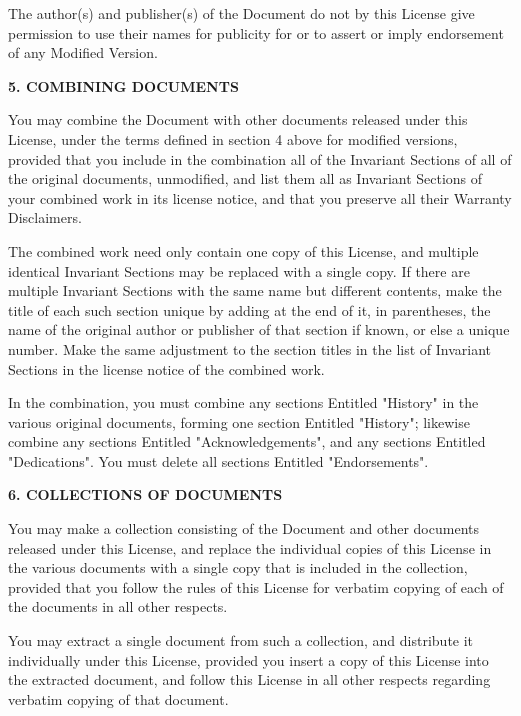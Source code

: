 \documentclass[a4paper,11pt]{article}
\begin{document}
The author(s) and publisher(s) of the Document do not by this License
give permission to use their names for publicity for or to assert or
imply endorsement of any Modified Version.


\begin{center}
{\Large\bf 5. COMBINING DOCUMENTS}
\end{center}


You may combine the Document with other documents released under this
License, under the terms defined in section 4 above for modified
versions, provided that you include in the combination all of the
Invariant Sections of all of the original documents, unmodified, and
list them all as Invariant Sections of your combined work in its
license notice, and that you preserve all their Warranty Disclaimers.

The combined work need only contain one copy of this License, and
multiple identical Invariant Sections may be replaced with a single
copy.  If there are multiple Invariant Sections with the same name but
different contents, make the title of each such section unique by
adding at the end of it, in parentheses, the name of the original
author or publisher of that section if known, or else a unique number.
Make the same adjustment to the section titles in the list of
Invariant Sections in the license notice of the combined work.

In the combination, you must combine any sections Entitled "History"
in the various original documents, forming one section Entitled
"History"; likewise combine any sections Entitled "Acknowledgements",
and any sections Entitled "Dedications".  You must delete all sections
Entitled "Endorsements".

\begin{center}
{\Large\bf 6. COLLECTIONS OF DOCUMENTS}
\end{center}

You may make a collection consisting of the Document and other documents
released under this License, and replace the individual copies of this
License in the various documents with a single copy that is included in
the collection, provided that you follow the rules of this License for
verbatim copying of each of the documents in all other respects.

You may extract a single document from such a collection, and distribute
it individually under this License, provided you insert a copy of this
License into the extracted document, and follow this License in all
other respects regarding verbatim copying of that document.
\end{document}
